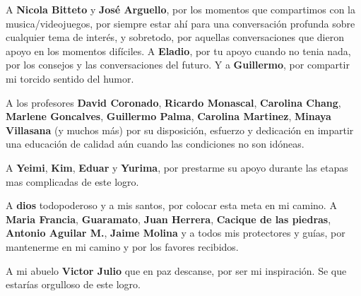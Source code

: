 \documentclass[hidelinks, letterpaper, 12pt, oneside]{tesis}
\renewcommand{\tablename}{Tabla}
\begin{document}
{A \textbf{Nicola Bitteto} y \textbf{José Arguello}, por los momentos que compartimos con la musica/videojuegos, por siempre estar ahí para una conversación profunda sobre cualquier tema de interés, y sobretodo, por aquellas conversaciones que dieron apoyo en los momentos difíciles. A \textbf{Eladio}, por tu apoyo cuando no tenia nada, por los consejos y las conversaciones del futuro. Y a \textbf{Guillermo}, por compartir mi torcido sentido del humor.

A los profesores \textbf{David Coronado}, \textbf{Ricardo Monascal}, \textbf{Carolina Chang}, \textbf{Marlene Goncalves}, \textbf{Guillermo Palma}, \textbf{Carolina Martinez}, \textbf{Minaya Villasana} (y muchos más) por su disposición, esfuerzo y dedicación en impartir una educación de calidad aún cuando las condiciones no son idóneas.

A \textbf{Yeimi}, \textbf{Kim}, \textbf{Eduar} y \textbf{Yurima}, por prestarme su apoyo durante las etapas mas complicadas de este logro.

A \textbf{dios} todopoderoso y a mis santos, por colocar esta meta en mi camino. A \textbf{Maria Francia}, \textbf{Guaramato}, \textbf{Juan Herrera}, \textbf{Cacique de las piedras}, \textbf{Antonio Aguilar M.}, \textbf{Jaime Molina} y a todos mis protectores y guías, por mantenerme en mi camino y por los favores recibidos.

A mi abuelo \textbf{Victor Julio} que en paz descanse, por ser mi inspiración. Se que estarías orgulloso de este logro.

}
\clearpage

\pagestyle{fancy}

\tableofcontents

\listoffigures

\renewcommand*\listtablename{Índice de tablas}
\renewcommand{\tablename}{Tabla}
\listoftables

\listofalgorithms
{}

\clearpage
{}
\end{document}
